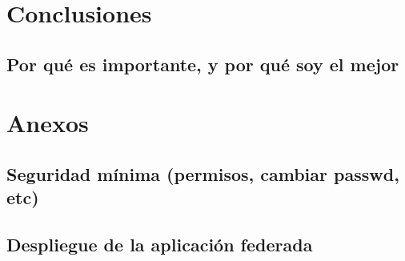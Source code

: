 

\tableofcontents












\chapter{Conclusiones}
    \section{Por qué es importante, y por qué soy el mejor}

\chapter{Anexos}
    \section{Seguridad mínima (permisos, cambiar passwd, etc)}
    \section{Despliegue de la aplicación federada}

\newpage


